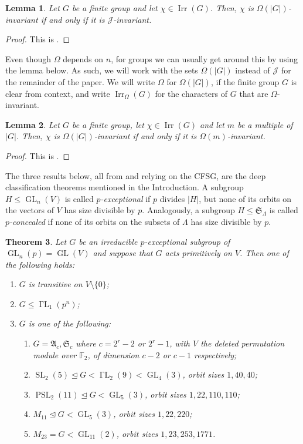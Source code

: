 \documentclass[12pt]{amsart}
\theoremstyle{theorem}
\newtheorem{teo}{Theorem}
\newtheorem{lem}[teo]{Lemma}
\theoremstyle{definition}
\newcommand{\fA} {\mathfrak A}
\newcommand{\fS} {\mathfrak S}
\newcommand{\FF}{{\mathbb{F}}}
\newcommand{\Irr}{{\operatorname{Irr}}}
\newcommand{\GL}{\operatorname{GL}}
\newcommand{\GaL}{\operatorname{\Gamma L}}
\newcommand{\SL}{\operatorname{SL}}
\newcommand{\PSL}{\operatorname{PSL}}
\begin{document}
	\begin{lem}
		Let $G$ be a finite group and let $\chi \in \Irr(G)$. Then, $\chi$ is $\Omega(|G|)$-invariant if and only if it is $\mathcal{J}$-invariant.
	\end{lem}
	
	\begin{proof}
		This is \cite[Lemma 2.1]{MMRSF}.
	\end{proof}
	
	Even though $\Omega$ depends on $n$, for groups we can usually get around this by using the lemma below. As such, we will work with the sets $\Omega(|G|)$ instead of $\mathcal{J}$ for the remainder of the paper. We will write $\Omega$ for $\Omega(|G|)$, if the finite group $G$ is clear from context, and write $\Irr_{\Omega}(G)$ for the characters of $G$ that are $\Omega$-invariant.
	
	\begin{lem}
		Let $G$ be a finite group, let $\chi \in \Irr(G)$ and let $m$ be a multiple of $|G|$. Then, $\chi$ is $\Omega(|G|)$-invariant if and only if it is $\Omega(m)$-invariant.
	\end{lem}
	
	\begin{proof}
		This is \cite[Corollary 2.2]{MMRSF}.
	\end{proof}
	
	The three results below, all from \cite{GLPST} and relying on the CFSG, are the deep classification theorems mentioned in the Introduction. A subgroup $H \leq \GL_n(V)$ is called \emph{$p$-exceptional} if $p$ divides $|H|$, but none of its orbits on the vectors of $V$ has size divisible by $p$. Analogously, a subgroup $H \leq \fS_{\Lambda}$ is called \emph{$p$-concealed} if none of its orbits on the subsets of $\Lambda$ has size divisible by $p$.
	
	\begin{teo}   \label{t1}
		Let $G$ be an irreducible $p$-exceptional subgroup of $\GL_n(p)=\GL(V)$
		and suppose that $G$ acts primitively on $V$. Then one of the following holds:
		\begin{enumerate}
			\item $G$ is transitive on $V\setminus\{0\}$;
			\item $G\leq\GaL_1(p^n)$;
			\item $G$ is one of the following:
			\begin{enumerate}
				\item[(i)] $G=\fA_c, \fS_c$ where $c=2^r-2$ or $2^r-1$, with $V$ the deleted
				permutation module over $\FF_2$, of dimension $c-2$ or $c-1$
				respectively;
				\item[(ii)] $\SL_2(5)\trianglelefteq G< \GaL_2(9)<\GL_4(3)$,
				orbit sizes $1,40,40$;
				\item[(iii)] $\PSL_2(11)\trianglelefteq G<\GL_5(3)$, orbit sizes $1,22,110,110$;
				\item[(iv)] $M_{11}\trianglelefteq G<\GL_5(3)$, orbit sizes $1,22,220$;
				\item[(v)] $M_{23}=G<\GL_{11}(2)$, orbit sizes $1,23,253,1771$.
			\end{enumerate}
		\end{enumerate}
	\end{teo}
	
\end{document}
